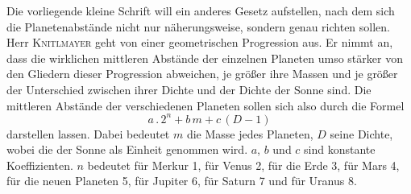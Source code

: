 Die vorliegende kleine Schrift will ein anderes Gesetz aufstellen, nach dem sich die Planetenabstände nicht nur näherungsweise, sondern genau richten sollen. Herr \textsc{Knitlmayer} geht von einer geometrischen Progression aus. Er nimmt an, dass die wirklichen mittleren Abstände der einzelnen Planeten umso stärker von den Gliedern dieser Progression abweichen, je größer ihre Massen und je größer der Unterschied zwischen ihrer Dichte und der Dichte der Sonne sind. Die mittleren Abstände der verschiedenen Planeten sollen sich also durch die Formel
\[ a \,.\, 2^n + b\,m + c\,(D - \mathrm{1}) \]
darstellen lassen. Dabei bedeutet $m$ die Masse jedes Planeten, $D$ seine Dichte, wobei die der Sonne als Einheit genommen wird. $a$, $b$ und $c$ sind konstante Koeffizienten. $n$ bedeutet für Merkur 1, für Venus 2, für die Erde 3, für Mars 4, für die neuen Planeten 5, für Jupiter 6, für Saturn 7 und für Uranus 8.


